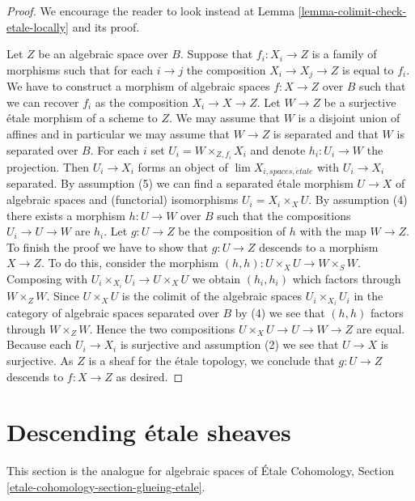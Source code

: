 \documentclass{stacks-project}
\theoremstyle{plain}
\theoremstyle{definition}
\theoremstyle{remark}
\numberwithin{equation}{subsection}
\def\lim{\mathop{\mathrm{lim}}\nolimits}
\def\etale{{\acute{e}tale}}
\begin{document}
\begin{proof}
We encourage the reader to look instead at
Lemma \ref{lemma-colimit-check-etale-locally}
and its proof.

\medskip\noindent
Let $Z$ be an algebraic space over $B$. Suppose that $f_i : X_i \to Z$ is
a family of morphisms such that for each $i \to j$ the composition
$X_i \to X_j \to Z$ is equal to $f_i$. We have to construct a morphism
of algebraic spaces $f : X \to Z$ over $B$ such that we can recover $f_i$ as
the composition $X_i \to X \to Z$. Let $W \to Z$ be a surjective
\'etale morphism of a scheme to $Z$. We may assume that $W$ is a
disjoint union of affines and in particular we may assume that
$W \to Z$ is separated and that $W$ is separated over $B$. For each $i$ set
$U_i = W \times_{Z, f_i} X_i$ and denote $h_i : U_i \to W$ the projection.
Then $U_i \to X_i$ forms an object of $\lim X_{i, spaces, \etale}$
with $U_i \to X_i$ separated. By
assumption (5) we can find a separated \'etale morphism $U \to X$
of algebraic spaces and (functorial) isomorphisms $U_i = X_i \times_X U$.
By assumption (4) there exists a morphism $h : U \to W$ over $B$
such that the compositions $U_i \to U \to W$ are $h_i$.
Let $g : U \to Z$ be the composition of $h$ with the map $W \to Z$. To
finish the proof we have to show that $g : U \to Z$
descends to a morphism $X \to Z$. To do this, consider the morphism
$(h, h) : U \times_X U \to W \times_S W$.
Composing with $U_i \times_{X_i} U_i \to U \times_X U$ we obtain
$(h_i, h_i)$ which factors through $W \times_Z W$. Since $U \times_X U$
is the colimit of the algebraic spaces $U_i \times_{X_i} U_i$
in the category of algebraic spaces separated over $B$ by (4) we see
that $(h, h)$ factors through $W \times_Z W$. Hence the two compositions
$U \times_X U \to U \to W \to Z$ are equal. Because each $U_i \to X_i$ is
surjective and assumption (2) we see that $U \to X$ is surjective.
As $Z$ is a sheaf for the \'etale topology, we conclude that
$g : U \to Z$ descends to $f : X \to Z$ as desired.
\end{proof}





\section{Descending \'etale sheaves}
\label{section-glueing-etale}

\noindent
This section is the analogue for algebraic spaces of
\'Etale Cohomology, Section \ref{etale-cohomology-section-glueing-etale}.
\end{document}
